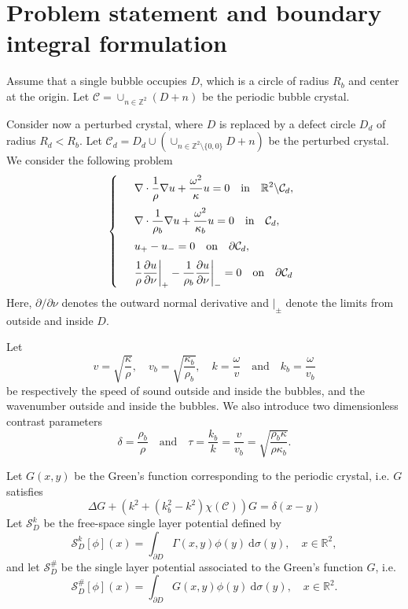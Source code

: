 \documentclass[a4paper]{article}
\author{Erik Orvehed Hiltunen}
\theoremstyle{definition}
\newcommand{\Z}{\mathbb{Z}}
\newcommand{\R}{\mathbb{R}}
\newcommand{\C}{\mathcal{C}}
\newcommand{\dx}{\: \mathrm{d}}
\newcommand{\Scrystal}{\mathcal{S}_D^\#}
\newcommand{\ds}{\displaystyle}
\def\nm{\noalign{\medskip}}
\begin{document}
\section{Problem statement and boundary integral formulation}
Assume that a single bubble occupies $D$, which is a circle of radius $R_b$ and center at the origin. Let $\C = \cup_{n\in\Z^2}(D+n)$ be the periodic bubble crystal.

Consider now a perturbed crystal, where $D$ is replaced by a defect circle $D_d$ of radius $R_d < R_b$. Let $\C_d = D_d \cup \left( \cup_{n\in\Z^2\setminus\{0,0\}} D+n \right)$ be the perturbed crystal. We consider the following problem
\begin{equation} \label{eq:scattering}
\left\{
\begin{array} {ll}
	&\ds \nabla \cdot \frac{1}{\rho} \nabla  u+ \frac{\omega^2}{\kappa} u  = 0 \quad \text{in} \quad \R^2 \backslash \C_d, \\
	\nm
	&\ds \nabla \cdot \frac{1}{\rho_b} \nabla  u+ \frac{\omega^2}{\kappa_b} u  = 0 \quad \text{in} \quad \C_d, \\
	\nm
	&\ds  u_{+} -u_{-}  =0   \quad \text{on} \quad \partial \C_d, \\
	\nm
	& \ds  \frac{1}{\rho} \frac{\partial u}{\partial \nu} \bigg|_{+} - \frac{1}{\rho_b} \frac{\partial u}{\partial \nu} \bigg|_{-} =0 \quad \text{on} \quad \partial \C_d
\end{array}
\right.
\end{equation}
Here, $\partial/\partial \nu$ denotes the outward normal derivative and $|_\pm$ denote the limits from outside and inside $D$.  

Let
\begin{equation*} %
v = \sqrt{\frac{\kappa}{\rho}}, \quad v_b = \sqrt{\frac{\kappa_b}{\rho_b}}, \quad k= \frac{\omega}{v} \quad \text{and} \quad k_b= \frac{\omega}{v_b}
\end{equation*}
be respectively the speed of sound outside and inside the bubbles, and the wavenumber outside and inside the bubbles. We also introduce two dimensionless contrast parameters
\begin{equation*} %
\delta = \frac{\rho_b}{\rho} \quad \text{and} \quad \tau= \frac{k_b}{k}= \frac{v}{v_b} =\sqrt{\frac{\rho_b \kappa}{\rho \kappa_b}}. 
\end{equation*}

Let $G(x,y)$ be the Green's function corresponding to the periodic crystal, i.e. $G$ satisfies
\begin{equation*} \label{eq:G}
\Delta G + (k^2+(k_b^2-k^2)\chi(\C))G = \delta(x-y)
\end{equation*}
Let $\mathcal{S}_{D}^k$ be the free-space single layer potential defined by
\begin{equation*}
\mathcal{S}_D^k[\phi](x) = \int_{\partial D} \Gamma(x,y)\phi(y) \dx \sigma(y), \quad x \in \R^2,
\end{equation*}
and let $\Scrystal$ be the single layer potential associated to the Green's function $G$, i.e.
\begin{equation*}
\Scrystal[\phi](x) = \int_{\partial D} G(x,y)\phi(y) \dx \sigma(y) , \quad x \in \R^2.
\end{equation*}
\end{document}

